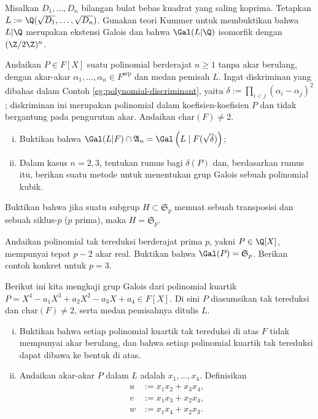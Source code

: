 \begin{Exercises}
	\item Misalkan $D_1, \ldots, D_n$ bilangan bulat bebas kuadrat yang saling koprima. Tetapkan $L := \Q(\sqrt{D_1}, \ldots, \sqrt{D_n})$. Gunakan teori Kummer untuk membuktikan bahwa $L|\Q$ merupakan ekstensi Galois dan bahwa $\Gal(L|\Q)$ isomorfik dengan $(\Z/2\Z)^n$.
	\item Andaikan $P \in F[X]$ suatu polinomial berderajat $n \geq 1$ tanpa akar berulang, dengan akar-akar $\alpha_1, \ldots, \alpha_n \in F^\text{sep}$ dan medan pemisah $L$. Ingat diskriminan yang dibahas dalam Contoh \ref{eg:polynomial-discriminant}, yaitu $\delta := \prod_{i < j} (\alpha_i - \alpha_j)^2$; diskriminan ini merupakan polinomial dalam koefisien-koefisien $P$ dan tidak bergantung pada pengurutan akar. Andaikan $\mathrm{char}(F) \neq 2$.
		\begin{enumerate}[(i)]
			\item Buktikan bahwa $\Gal(L|F) \cap \mathfrak{A}_n = \Gal\left( L \;|\; F(\sqrt{\delta}) \right)$;
			\item Dalam kasus $n=2, 3$, tentukan rumus bagi $\delta(P)$ dan, berdasarkan rumus itu, berikan suatu metode untuk menentukan grup Galois sebuah polinomial kubik.
		\end{enumerate}
	\item Buktikan bahwa jika suatu subgrup $H \subset \mathfrak{S}_p$ memuat sebuah transposisi dan sebuah siklus-$p$ ($p$ prima), maka $H = \mathfrak{S}_p$.
	\item Andaikan polinomial tak tereduksi berderajat prima $p$, yakni $P \in \Q[X]$, mempunyai tepat $p-2$ akar real. Buktikan bahwa $\Gal(P) = \mathfrak{S}_p$. Berikan contoh konkret untuk $p=3$.
	\item Berikut ini kita mengkaji grup Galois dari polinomial kuartik $P = X^4 - a_1 X^3 + a_2 X^2 - a_3 X + a_4 \in F[X]$. Di sini $P$ diasumsikan tak tereduksi dan $\text{char}(F) \neq 2$, serta medan pemisahnya ditulis $L$.
		\begin{enumerate}[(i)]
			\item Buktikan bahwa setiap polinomial kuartik tak tereduksi di atas $F$ tidak mempunyai akar berulang, dan bahwa setiap polinomial kuartik tak tereduksi dapat dibawa ke bentuk di atas.
			\item Andaikan akar-akar $P$ dalam $L$ adalah $x_1, \ldots, x_4$. Definisikan
				\begin{align*}
					u & := x_1 x_2 + x_3 x_4, \\
					v & := x_1 x_3 + x_2 x_4, \\
					w & := x_1 x_4 + x_2 x_3.

\end{align*}
\end{enumerate}
\end{Exercises}
